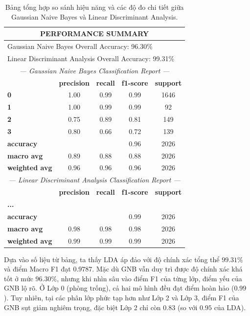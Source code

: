 \begin{table}[!htbp]
    \centering
    \caption{Bảng tổng hợp so sánh hiệu năng và các độ đo chi tiết giữa Gaussian Naive Bayes và Linear Discriminant Analysis.}
    \label{tab:gnb_lda_comparison_table}
    \renewcommand{\arraystretch}{1.15}
    \begin{tabular}{lcccc}
        \toprule
        \multicolumn{5}{c}{\textbf{PERFORMANCE SUMMARY}} \\
        \midrule
        \multicolumn{5}{l}{Gaussian Naive Bayes Overall Accuracy: 96.30\%} \\
        \multicolumn{5}{l}{Linear Discriminant Analysis Overall Accuracy: 99.31\%} \\
        \midrule
        \multicolumn{5}{c}{\textit{--- Gaussian Naive Bayes Classification Report ---}} \\
        & \textbf{precision} & \textbf{recall} & \textbf{f1-score} & \textbf{support} \\
        \midrule
        \textbf{0} & 1.00 & 0.99 & 0.99 & 1646 \\
        \textbf{1} & 1.00 & 0.99 & 0.99 & 92 \\
        \textbf{2} & 0.75 & 0.89 & 0.81 & 149 \\
        \textbf{3} & 0.80 & 0.66 & 0.72 & 139 \\
        \midrule
        \textbf{accuracy} & & & 0.96 & 2026 \\
        \textbf{macro avg} & 0.89 & 0.88 & 0.88 & 2026 \\
        \textbf{weighted avg} & 0.96 & 0.96 & 0.96 & 2026 \\
        \midrule
        \multicolumn{5}{c}{\textit{--- Linear Discriminant Analysis Classification Report ---}} \\
        & \textbf{precision} & \textbf{recall} & \textbf{f1-score} & \textbf{support} \\
        \midrule
        \textbf{...} & & & & \\
        \textbf{accuracy} & & & 0.99 & 2026 \\
        \textbf{macro avg} & 0.98 & 0.98 & 0.98 & 2026 \\
        \textbf{weighted avg} & 0.99 & 0.99 & 0.99 & 2026 \\
        \bottomrule
    \end{tabular}
\end{table}

Dựa vào số liệu từ bảng, ta thấy LDA áp đảo với độ chính xác tổng thể $99.31\%$ và điểm Macro F1 đạt $0.9787$. Mặc dù GNB vẫn duy trì được độ chính xác khá tốt ở mức $96.30\%$, nhưng khi nhìn sâu vào điểm F1 của từng lớp, điểm yếu của GNB lộ rõ. Ở Lớp 0 (phòng trống), cả hai mô hình đều đạt điểm hoàn hảo ($0.99$). Tuy nhiên, tại các phân lớp phức tạp hơn như Lớp 2 và Lớp 3, điểm F1 của GNB sụt giảm nghiêm trọng, đặc biệt Lớp 2 chỉ còn $0.83$ (so với $0.95$ của LDA).

